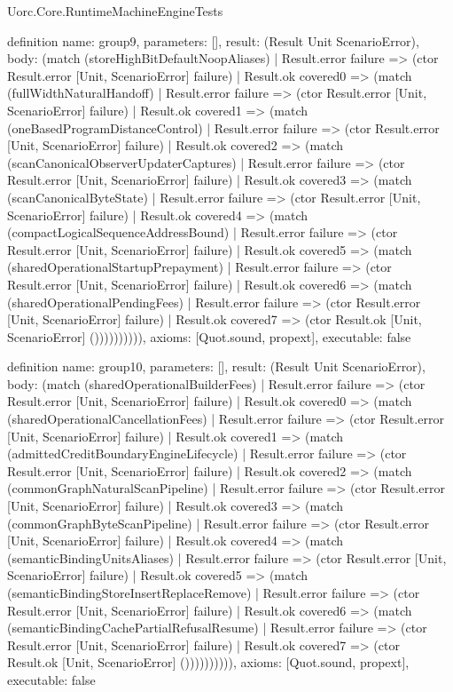 \begin{lexlean}{Uorc.Core.RuntimeMachineEngineTests}
\begin{semanticmodule}
definition{
  name: group9,
  parameters: [],
  result: (Result Unit ScenarioError),
  body: (match (storeHighBitDefaultNoopAliases)
    | Result.error failure => (ctor Result.error [Unit, ScenarioError] failure)
    | Result.ok covered0 => (match (fullWidthNaturalHandoff)
      | Result.error failure => (ctor Result.error [Unit, ScenarioError] failure)
      | Result.ok covered1 => (match (oneBasedProgramDistanceControl)
        | Result.error failure => (ctor Result.error [Unit, ScenarioError] failure)
        | Result.ok covered2 => (match (scanCanonicalObserverUpdaterCaptures)
          | Result.error failure => (ctor Result.error [Unit, ScenarioError] failure)
          | Result.ok covered3 => (match (scanCanonicalByteState)
            | Result.error failure => (ctor Result.error [Unit, ScenarioError] failure)
            | Result.ok covered4 => (match (compactLogicalSequenceAddressBound)
              | Result.error failure => (ctor Result.error [Unit, ScenarioError] failure)
              | Result.ok covered5 => (match (sharedOperationalStartupPrepayment)
                | Result.error failure => (ctor Result.error [Unit, ScenarioError] failure)
                | Result.ok covered6 => (match (sharedOperationalPendingFees)
                  | Result.error failure => (ctor Result.error [Unit, ScenarioError] failure)
                  | Result.ok covered7 => (ctor Result.ok [Unit, ScenarioError] ()))))))))),
  axioms: [Quot.sound, propext],
  executable: false
}

definition{
  name: group10,
  parameters: [],
  result: (Result Unit ScenarioError),
  body: (match (sharedOperationalBuilderFees)
    | Result.error failure => (ctor Result.error [Unit, ScenarioError] failure)
    | Result.ok covered0 => (match (sharedOperationalCancellationFees)
      | Result.error failure => (ctor Result.error [Unit, ScenarioError] failure)
      | Result.ok covered1 => (match (admittedCreditBoundaryEngineLifecycle)
        | Result.error failure => (ctor Result.error [Unit, ScenarioError] failure)
        | Result.ok covered2 => (match (commonGraphNaturalScanPipeline)
          | Result.error failure => (ctor Result.error [Unit, ScenarioError] failure)
          | Result.ok covered3 => (match (commonGraphByteScanPipeline)
            | Result.error failure => (ctor Result.error [Unit, ScenarioError] failure)
            | Result.ok covered4 => (match (semanticBindingUnitsAliases)
              | Result.error failure => (ctor Result.error [Unit, ScenarioError] failure)
              | Result.ok covered5 => (match (semanticBindingStoreInsertReplaceRemove)
                | Result.error failure => (ctor Result.error [Unit, ScenarioError] failure)
                | Result.ok covered6 => (match (semanticBindingCachePartialRefusalResume)
                  | Result.error failure => (ctor Result.error [Unit, ScenarioError] failure)
                  | Result.ok covered7 => (ctor Result.ok [Unit, ScenarioError] ()))))))))),
  axioms: [Quot.sound, propext],
  executable: false
}


\end{semanticmodule}
\end{lexlean}
